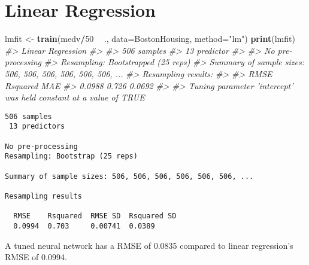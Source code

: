 \documentclass[]{book}
\newenvironment{Shaded}{\begin{snugshade}}{\end{snugshade}}
\newcommand{\CommentTok}[1]{\textcolor[rgb]{0.56,0.35,0.01}{\textit{#1}}}
\newcommand{\DataTypeTok}[1]{\textcolor[rgb]{0.13,0.29,0.53}{#1}}
\newcommand{\DecValTok}[1]{\textcolor[rgb]{0.00,0.00,0.81}{#1}}
\newcommand{\KeywordTok}[1]{\textcolor[rgb]{0.13,0.29,0.53}{\textbf{#1}}}
\newcommand{\NormalTok}[1]{#1}
\newcommand{\OperatorTok}[1]{\textcolor[rgb]{0.81,0.36,0.00}{\textbf{#1}}}
\newcommand{\StringTok}[1]{\textcolor[rgb]{0.31,0.60,0.02}{#1}}
\begin{document}
\hypertarget{linear-regression}{%
\section{Linear Regression}\label{linear-regression}}

\begin{Shaded}
\begin{Highlighting}[]
\NormalTok{ lmfit <-}\StringTok{ }\KeywordTok{train}\NormalTok{(medv}\OperatorTok{/}\DecValTok{50} \OperatorTok{~}\StringTok{ }\NormalTok{., }\DataTypeTok{data=}\NormalTok{BostonHousing, }\DataTypeTok{method=}\StringTok{"lm"}\NormalTok{) }
 \KeywordTok{print}\NormalTok{(lmfit)}
\CommentTok{#> Linear Regression }
\CommentTok{#> }
\CommentTok{#> 506 samples}
\CommentTok{#>  13 predictor}
\CommentTok{#> }
\CommentTok{#> No pre-processing}
\CommentTok{#> Resampling: Bootstrapped (25 reps) }
\CommentTok{#> Summary of sample sizes: 506, 506, 506, 506, 506, 506, ... }
\CommentTok{#> Resampling results:}
\CommentTok{#> }
\CommentTok{#>   RMSE    Rsquared  MAE   }
\CommentTok{#>   0.0988  0.726     0.0692}
\CommentTok{#> }
\CommentTok{#> Tuning parameter 'intercept' was held constant at a value of TRUE}
\end{Highlighting}
\end{Shaded}

\begin{verbatim}
506 samples
 13 predictors
 
No pre-processing
Resampling: Bootstrap (25 reps) 
 
Summary of sample sizes: 506, 506, 506, 506, 506, 506, ... 
 
Resampling results
 
  RMSE    Rsquared  RMSE SD  Rsquared SD
  0.0994  0.703     0.00741  0.0389    
\end{verbatim}

A tuned neural network has a RMSE of 0.0835 compared to linear regression's RMSE of 0.0994.


\end{document}
